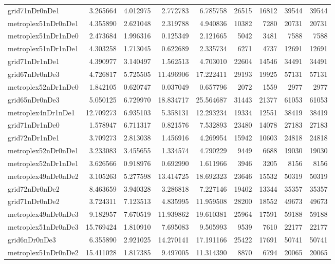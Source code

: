 \begin{longtable}{|l|r|r|r|r|r|r|r|r|}
grid71nDr0nDe1 & 3.265664 & 4.012975 & 2.772783 & 6.785758 & 26515 & 16812 & 39544 & 39544 \\
metroplex51nDr0nDe1 & 4.355890 & 2.621048 & 2.319788 & 4.940836 & 10382 & 7280 & 20731 & 20731 \\
metroplex51nDr1nDe0 & 2.473684 & 1.996316 & 0.125349 & 2.121665 & 5042 & 3481 & 7588 & 7588 \\
metroplex51nDr1nDe1 & 4.303258 & 1.713045 & 0.622689 & 2.335734 & 6271 & 4737 & 12691 & 12691 \\
grid71nDr1nDe1 & 4.390977 & 3.140497 & 1.562513 & 4.703010 & 22604 & 14546 & 34491 & 34491 \\
grid67nDr0nDe3 & 4.726817 & 5.725505 & 11.496906 & 17.222411 & 29193 & 19925 & 57131 & 57131 \\
metroplex52nDr1nDe0 & 1.842105 & 0.620747 & 0.037049 & 0.657796 & 2072 & 1559 & 2977 & 2977 \\
grid65nDr0nDe3 & 5.050125 & 6.729970 & 18.834717 & 25.564687 & 31443 & 21377 & 61053 & 61053 \\
metroplex4nDr1nDe1 & 12.709273 & 6.935103 & 5.358131 & 12.293234 & 19334 & 12551 & 38419 & 38419 \\
grid71nDr1nDe0 & 1.578947 & 6.711317 & 0.821576 & 7.532893 & 23480 & 14078 & 27183 & 27183 \\
grid72nDr1nDe1 & 3.709273 & 2.813038 & 1.456916 & 4.269954 & 15942 & 10603 & 24818 & 24818 \\
metroplex52nDr0nDe1 & 3.233083 & 3.455655 & 1.334574 & 4.790229 & 9449 & 6688 & 19030 & 19030 \\
metroplex52nDr1nDe1 & 3.626566 & 0.918976 & 0.692990 & 1.611966 & 3946 & 3205 & 8156 & 8156 \\
metroplex49nDr0nDe2 & 3.105263 & 5.277598 & 13.414725 & 18.692323 & 23646 & 15532 & 50319 & 50319 \\
grid72nDr0nDe2 & 8.463659 & 3.940328 & 3.286818 & 7.227146 & 19402 & 13344 & 35357 & 35357 \\
grid71nDr0nDe2 & 3.724311 & 7.123513 & 4.835995 & 11.959508 & 28200 & 18552 & 49673 & 49673 \\
metroplex49nDr0nDe3 & 9.182957 & 7.670519 & 11.939862 & 19.610381 & 25964 & 17591 & 59188 & 59188 \\
metroplex51nDr0nDe3 & 15.769424 & 1.810910 & 7.695083 & 9.505993 & 9539 & 7610 & 22177 & 22177 \\
grid6nDr0nDe3 & 6.355890 & 2.921025 & 14.270141 & 17.191166 & 25422 & 17691 & 50741 & 50741 \\
metroplex51nDr0nDe2 & 15.411028 & 1.817385 & 9.497005 & 11.314390 & 8870 & 6794 & 20065 & 20065 \\

\end{longtable}
